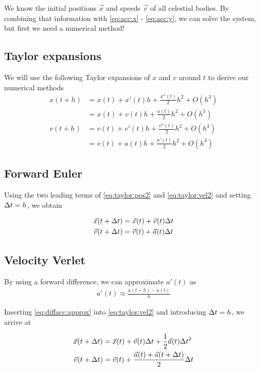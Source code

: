 \documentclass[a4paper]{article}
\begin{document}
We know the initial positions $\vec{x}$ and speeds $\vec{v}$ of all celestial bodies. By combining that information with \eqref{eq:acc:x} - \eqref{eq:acc:y}, we can solve the system, but first we need a numerical method!




\subsection{Taylor expansions}
We will use the following Taylor expansions of $x$ and $v$ around $t$ to derive our numerical methods
\begin{align}
    x(t + h) &= x(t) + x'(t) h + \frac{x''(t)}{2} h^2 + O(h^3) \label{eq:taylor:pos1}\\
    &= x(t) + v(t) h + \frac{a(t)}{2} h^2 + O(h^3) \label{eq:taylor:pos2} \\
    v(t + h) &= v(t) + v'(t) h + \frac{v''(t)}{2} h^2 + O(h^3) \label{eq:taylor:vel1} \\
    &= v(t) + a(t) h + \frac{a'(t)}{2} h^2 + O(h^3) \label{eq:taylor:vel2}
\end{align}

\subsection{Forward Euler}
Using the two leading terms of \eqref{eq:taylor:pos2} and \eqref{eq:taylor:vel2} and setting ${\Delta t} = h$, we obtain

\begin{align}
    \vec{x}(t + {\Delta t}) &= \vec{x}(t) + \vec{v}(t){\Delta t}  \label{eq:forwardeuler:pos} \\
    \vec{v}(t + {\Delta t}) &= \vec{v}(t) + \vec{a}(t){\Delta t} \label{eq:forwardeuler:vel}
\end{align}

\subsection{Velocity Verlet}

By using a forward difference, we can approximate $a'(t)$ as
\begin{align}
    a'(t) \approx \frac{a(t+h) - a(t)}{h} \label{eq:diffacc:approx}
\end{align}

Inserting \eqref{eq:diffacc:approx} into \eqref{eq:taylor:vel2} and introducing ${\Delta t} = h$, we arrive at

\begin{align}
\vec{x}(t + {\Delta t}) &= \vec{x}(t) + \vec{v}(t){\Delta t} + \frac{1}{2} \vec{a}(t) {\Delta t}^2 \label{eq:velverlet:pos} \\
\vec{v}(t + {\Delta t}) &= \vec{v}(t) + \frac{\vec{a}(t) + \vec{a}(t + {\Delta t})}{2} {\Delta t} \label{eq:velverlet:vel}
\end{align}
\end{document}
